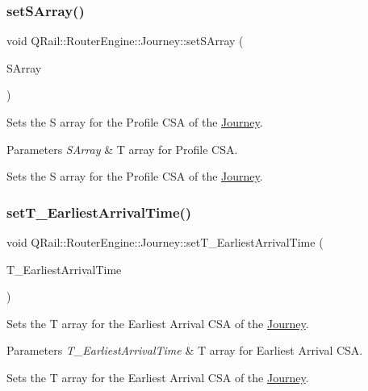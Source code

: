 \subsubsection{\texorpdfstring{setSArray()}{setSArray()}}
{\footnotesize\ttfamily void Q\+Rail\+::\+Router\+Engine\+::\+Journey\+::set\+S\+Array (\begin{DoxyParamCaption}\item[{const Q\+Map$<$ Q\+Url, Q\+List$<$ \mbox{\hyperlink{classQRail_1_1RouterEngine_1_1StationStopProfile}{Q\+Rail\+::\+Router\+Engine\+::\+Station\+Stop\+Profile}} $\ast$ $>$ $>$ \&}]{S\+Array }\end{DoxyParamCaption})}



Sets the S array for the Profile C\+SA of the \mbox{\hyperlink{classQRail_1_1RouterEngine_1_1Journey}{Journey}}. 


\begin{DoxyParams}{Parameters}
{\em S\+Array} & T array for Profile C\+SA.\\
\hline
\end{DoxyParams}
Sets the S array for the Profile C\+SA of the \mbox{\hyperlink{classQRail_1_1RouterEngine_1_1Journey}{Journey}}. \mbox{\label{classQRail_1_1RouterEngine_1_1Journey_af477bba913bb4326528a2f9dcd2b2e82}} 
\subsubsection{\texorpdfstring{setT\_EarliestArrivalTime()}{setT\_EarliestArrivalTime()}}
{\footnotesize\ttfamily void Q\+Rail\+::\+Router\+Engine\+::\+Journey\+::set\+T\+\_\+\+Earliest\+Arrival\+Time (\begin{DoxyParamCaption}\item[{const Q\+Map$<$ Q\+Url, qint16 $>$ \&}]{T\+\_\+\+Earliest\+Arrival\+Time }\end{DoxyParamCaption})}



Sets the T array for the Earliest Arrival C\+SA of the \mbox{\hyperlink{classQRail_1_1RouterEngine_1_1Journey}{Journey}}. 


\begin{DoxyParams}{Parameters}
{\em T\+\_\+\+Earliest\+Arrival\+Time} & T array for Earliest Arrival C\+SA.\\
\hline
\end{DoxyParams}
Sets the T array for the Earliest Arrival C\+SA of the \mbox{\hyperlink{classQRail_1_1RouterEngine_1_1Journey}{Journey}}. \mbox{\label{classQRail_1_1RouterEngine_1_1Journey_acbdb23fc240d5344a20a753bcbb332d5}} 
